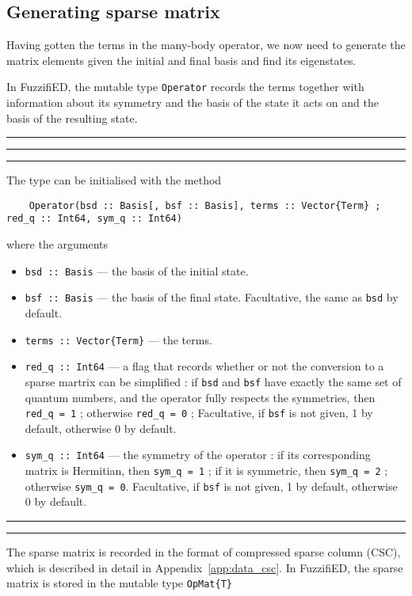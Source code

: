 \documentclass{timesjhep}
\newenvironment{block}[1]{\vspace{0.4\baselineskip}\hrule\vspace{0.10\baselineskip}\hrule\vspace{0.30\baselineskip}{\bfseries #1}\vspace{0.2\baselineskip}\hrule\vspace{0.3\baselineskip}
}{\vspace{0.2\baselineskip}\hrule\vspace{0.10\baselineskip}\hrule\vspace{0.5\baselineskip}}
\begin{document}
\subsection{Generating sparse matrix}
\label{sec:ed_opmat}

Having gotten the terms in the many-body operator, we now need to generate the matrix elements given the initial and final basis and find its eigenstates. 

In FuzzifiED, the mutable type \lstinline|Operator| records the terms together with information about its symmetry and the basis of the state it acts on and the basis of the resulting state. 

\begin{block}{\lstinline|Operator| --- Type}
The type can be initialised with the method 
\begin{lstlisting}
    Operator(bsd :: Basis[, bsf :: Basis], terms :: Vector{Term} ; red_q :: Int64, sym_q :: Int64)
\end{lstlisting}
where the arguments 
\begin{itemize}
    \item \lstinline|bsd :: Basis| --- the basis of the initial state.
    \item \lstinline|bsf :: Basis| --- the basis of the final state. Facultative, the same as \lstinline|bsd| by default. 
    \item \lstinline|terms :: Vector{Term}| --- the terms.
    \item \lstinline|red_q :: Int64| --- a flag that records whether or not the conversion to a sparse martrix can be simplified : if \lstinline|bsd| and \lstinline|bsf| have exactly the same set of quantum numbers, and the operator fully respects the symmetries, then \lstinline|red_q = 1| ; otherwise \lstinline|red_q = 0| ; Facultative, if \lstinline|bsf| is not given, 1 by default, otherwise 0 by default.
    \item \lstinline|sym_q :: Int64| --- the symmetry of the operator : if its corresponding matrix is Hermitian, then \lstinline|sym_q = 1| ; if it is symmetric, then \lstinline|sym_q = 2| ; otherwise \lstinline|sym_q = 0|. Facultative, if \lstinline|bsf| is not given, 1 by default, otherwise 0 by default.
\end{itemize}
\end{block}

The sparse matrix is recorded in the format of compressed sparse column (CSC), which is described in detail in Appendix~\ref{app:data_csc}. In FuzzifiED, the sparse matrix is stored in the mutable type \lstinline|OpMat{T}|
\end{document}
